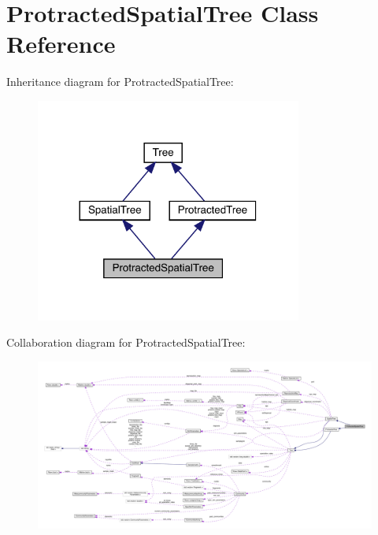 \hypertarget{class_protracted_spatial_tree}{}\section{Protracted\+Spatial\+Tree Class Reference}
\label{class_protracted_spatial_tree}


Inheritance diagram for Protracted\+Spatial\+Tree\+:\nopagebreak
\begin{figure}[H]
\begin{center}
\leavevmode
\includegraphics[width=248pt]{class_protracted_spatial_tree__inherit__graph}
\end{center}
\end{figure}


Collaboration diagram for Protracted\+Spatial\+Tree\+:
\nopagebreak
\begin{figure}[H]
\begin{center}
\leavevmode
\includegraphics[width=350pt]{class_protracted_spatial_tree__coll__graph}
\end{center}
\end{figure}
